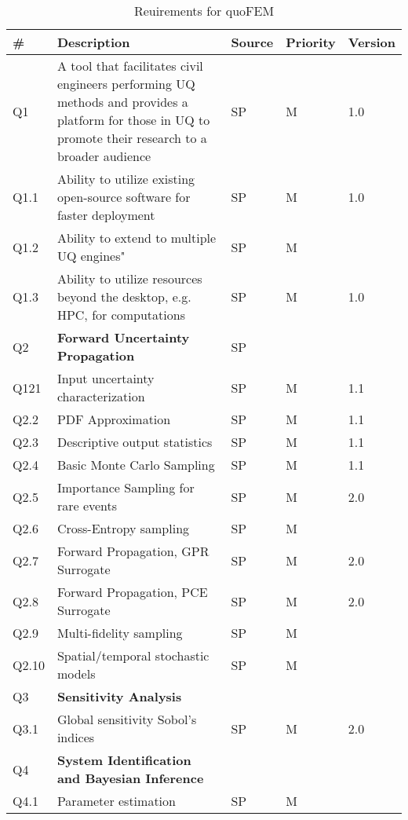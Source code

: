\begin{longtable}{| p{} | p{} | p{} | p{} |  p{} |}
\caption{Reuirements for quoFEM}             
  \label{tab:featureQuo_FEM}     
     \\
   \hline
\rowcolor{lightgray}
      \# & Description & Source & Priority & Version \\ \hline
      Q1 & A tool that facilitates civil engineers performing UQ methods and provides a platform for those in UQ to promote their research to a broader audience & SP & M & 1.0     \\ \hline
      Q1.1 &  Ability to utilize existing open-source software for faster deployment
 & SP & M & 1.0 \\ \hline    
     Q1.2 & Ability to extend to multiple UQ engines" & SP & M & \\ \hline
     Q1.3 & Ability to utilize resources beyond the desktop, e.g. HPC, for computations & SP & M & 1.0 \\  \hhline{=====}
     Q2 & \textbf{Forward Uncertainty Propagation} & SP &  &  \\  \hline
	Q121 & Input uncertainty characterization & SP & M & 1.1 \\ \hline
	Q2.2 & PDF Approximation & SP & M & 1.1 \\ \hline
	Q2.3 &  Descriptive output statistics & SP & M & 1.1 \\ \hline
	Q2.4 &  Basic Monte Carlo Sampling  & SP & M & 1.1 \\ \hline	
	Q2.5 &  Importance Sampling for rare events  & SP & M & 2.0 \\ \hline	
	Q2.6 &  Cross-Entropy sampling  & SP & M &  \\ \hline
	Q2.7 &  Forward Propagation, GPR Surrogate  & SP & M & 2.0 \\ \hline
	Q2.8 &  Forward Propagation, PCE Surrogate  & SP & M & 2.0 \\ \hline
	Q2.9 &  Multi-fidelity sampling  & SP & M &  \\ \hline
	Q2.10 &  Spatial/temporal stochastic models  & SP & M &  \\ \hhline{=====}
	Q3 & \textbf{Sensitivity Analysis} &  &  & \\ \hline
	Q3.1 & Global sensitivity Sobol's indices & SP & M & 2.0  \\ \hhline{=====}
	Q4 & \textbf{System Identification and Bayesian Inference} &  &  \\ \hline
	Q4.1 & Parameter estimation & SP & M &  \\ \hline

\end{longtable}
